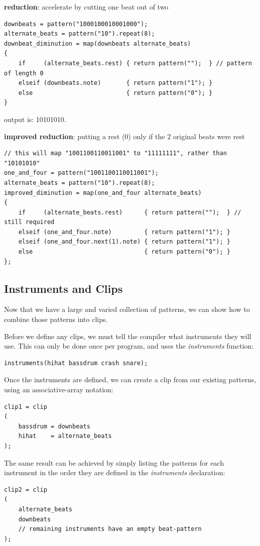 \documentclass[11pt,twoside]{article}
\begin{document}
\textbf{reduction}: accelerate by cutting one beat out of two
\begin{verbatim}
downbeats = pattern("1000100010001000");
alternate_beats = pattern("10").repeat(8);
downbeat_diminution = map(downbeats alternate_beats)
{
    if     (alternate_beats.rest) { return pattern("");  } // pattern of length 0
    elseif (downbeats.note)       { return pattern("1"); }
    else                          { return pattern("0"); }
}
\end{verbatim}
output is: 10101010.

\textbf{improved reduction}: putting a rest (0) only if the $2$ original beats were rest
\begin{verbatim}
// this will map "1001100110011001" to "11111111", rather than "10101010"
one_and_four = pattern("1001100110011001");
alternate_beats = pattern("10").repeat(8);
improved_diminution = map(one_and_four alternate_beats)
{
    if     (alternate_beats.rest)      { return pattern("");  } // still required
    elseif (one_and_four.note)         { return pattern("1"); }
    elseif (one_and_four.next(1).note) { return pattern("1"); }
    else                               { return pattern("0"); }
};
\end{verbatim}

\subsection{Instruments and Clips}

Now that we have a large and varied collection of patterns, we can show how to combine those patterns into clips.  

Before we define any clips, we must tell the compiler what instruments they will use.  This can only be done once per program, and uses the \textit{instruments} function:

\begin{verbatim}
instruments(hihat bassdrum crash snare);
\end{verbatim}

Once the instruments are defined, we can create a clip from our existing patterns, using an
associative-array notation:

\begin{verbatim}
clip1 = clip
(
    bassdrum = downbeats
    hihat    = alternate_beats
);
\end{verbatim}

The same result can be achieved by simply listing the patterns for each instrument in the order they are defined in the \textit{instruments} declaration:
\begin{verbatim}
clip2 = clip
(
    alternate_beats
    downbeats
    // remaining instruments have an empty beat-pattern
);

\end{verbatim}
\end{document}
